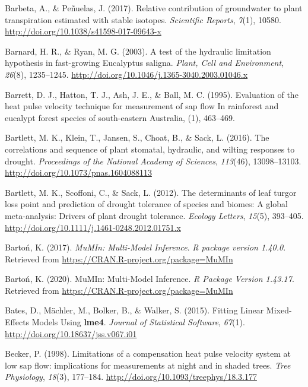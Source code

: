 \documentclass[11pt,twoside]{reedthesis}
\begin{document}
\hypertarget{ref-barbeta_relative_2017}{}
Barbeta, A., \& Peñuelas, J. (2017). Relative contribution of
groundwater to plant transpiration estimated with stable isotopes.
\emph{Scientific Reports}, \emph{7}(1), 10580.
\url{http://doi.org/10.1038/s41598-017-09643-x}

\hypertarget{ref-barnard_test_2003}{}
Barnard, H. R., \& Ryan, M. G. (2003). A test of the hydraulic
limitation hypothesis in fast-growing Eucalyptus saligna. \emph{Plant,
Cell and Environment}, \emph{26}(8), 1235--1245.
\url{http://doi.org/10.1046/j.1365-3040.2003.01046.x}

\hypertarget{ref-Barrett1995}{}
Barrett, D. J., Hatton, T. J., Ash, J. E., \& Ball, M. C. (1995).
Evaluation of the heat pulse velocity technique for measurement of sap
flow In rainforest and eucalypt forest species of south-eastern
Australia, (1), 463--469.

\hypertarget{ref-bartlett_correlations_2016}{}
Bartlett, M. K., Klein, T., Jansen, S., Choat, B., \& Sack, L. (2016).
The correlations and sequence of plant stomatal, hydraulic, and wilting
responses to drought. \emph{Proceedings of the National Academy of
Sciences}, \emph{113}(46), 13098--13103.
\url{http://doi.org/10.1073/pnas.1604088113}

\hypertarget{ref-bartlett_determinants_2012}{}
Bartlett, M. K., Scoffoni, C., \& Sack, L. (2012). The determinants of
leaf turgor loss point and prediction of drought tolerance of species
and biomes: A global meta-analysis: Drivers of plant drought tolerance.
\emph{Ecology Letters}, \emph{15}(5), 393--405.
\url{http://doi.org/10.1111/j.1461-0248.2012.01751.x}

\hypertarget{ref-Barton2017}{}
Bartoń, K. (2017). \emph{MuMIn: Multi-Model Inference}. \emph{R package
version 1.40.0}. Retrieved from
\url{https://CRAN.R-project.org/package=MuMIn}

\hypertarget{ref-barton_mumin_2020}{}
Bartoń, K. (2020). MuMIn: Multi-Model Inference. \emph{R Package Version
1.43.17}. Retrieved from \url{https://CRAN.R-project.org/package=MuMIn}

\hypertarget{ref-Bates2015}{}
Bates, D., Mächler, M., Bolker, B., \& Walker, S. (2015). Fitting Linear
Mixed-Effects Models Using \textbf{lme4}. \emph{Journal of Statistical
Software}, \emph{67}(1). \url{http://doi.org/10.18637/jss.v067.i01}

\hypertarget{ref-Becker1998}{}
Becker, P. (1998). Limitations of a compensation heat pulse velocity
system at low sap flow: implications for measurements at night and in
shaded trees. \emph{Tree Physiology}, \emph{18}(3), 177--184.
\url{http://doi.org/10.1093/treephys/18.3.177}
\end{document}
